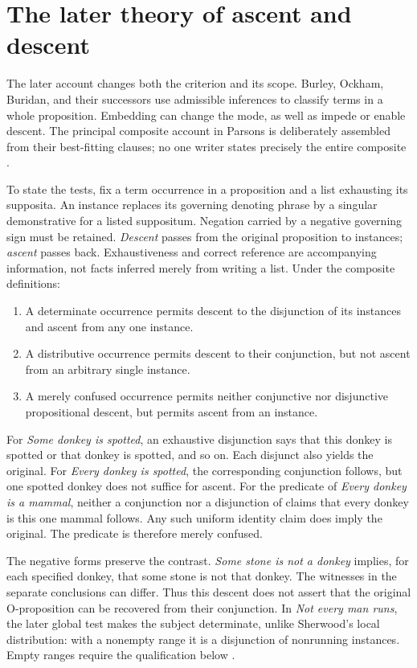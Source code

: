 \section{The later theory of ascent and descent}
\label{sec:p13-supposition-later-modes}

The later account changes both the criterion and its scope. Burley,
Ockham, Buridan, and their successors use admissible inferences to
classify terms in a whole proposition. Embedding can change the mode,
as well as impede or enable descent. The principal composite account
in Parsons is deliberately assembled from their best-fitting clauses;
no one writer states precisely the entire composite
\cite[pp.~241--245,260--266]{Parsons2007FordhamSupposition}.

To state the tests, fix a term occurrence in a proposition and a list
exhausting its supposita. An instance replaces its governing denoting
phrase by a singular demonstrative for a listed suppositum. Negation
carried by a negative governing sign must be retained. \emph{Descent}
passes from the original proposition to instances; \emph{ascent} passes
back. Exhaustiveness and correct reference are accompanying information,
not facts inferred merely from writing a list. Under the composite
definitions:

\begin{enumerate}
\item A determinate occurrence permits descent to the disjunction of
  its instances and ascent from any one instance.
\item A distributive occurrence permits descent to their conjunction,
  but not ascent from an arbitrary single instance.
\item A merely confused occurrence permits neither conjunctive nor
  disjunctive propositional descent, but permits ascent from an instance.
\end{enumerate}

For \emph{Some donkey is spotted}, an exhaustive disjunction says that
this donkey is spotted or that donkey is spotted, and so on. Each
disjunct also yields the original. For \emph{Every donkey is spotted},
the corresponding conjunction follows, but one spotted donkey does
not suffice for ascent. For the predicate of \emph{Every donkey is
a mammal}, neither a conjunction nor a disjunction of claims that every
donkey is this one mammal follows. Any such uniform identity claim
does imply the original. The predicate is therefore merely confused.

The negative forms preserve the contrast. \emph{Some stone is not
a donkey} implies, for each specified donkey, that some stone is not
that donkey. The witnesses in the separate conclusions can differ.
Thus this descent does not assert that the original O-proposition can
be recovered from their conjunction. In \emph{Not every man runs},
the later global test makes the subject determinate, unlike Sherwood's
local distribution: with a nonempty range it is a disjunction of
nonrunning instances. Empty ranges require the qualification below
\cite[pp.~242--246]{Parsons2007FordhamSupposition}.

